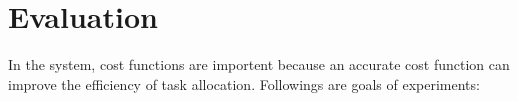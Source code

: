 \chapter{Evaluation}









In the system, cost functions are importent because an accurate cost function can improve the efficiency of task allocation. Followings are goals of experiments:

